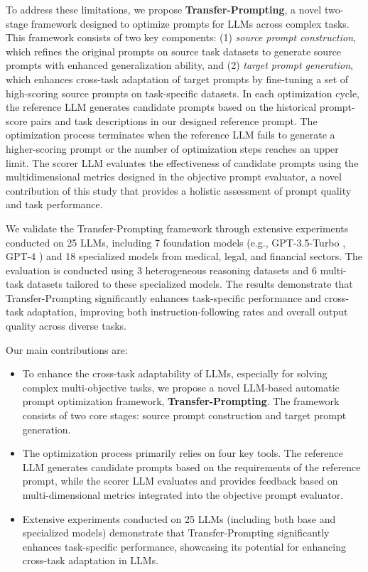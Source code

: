To address these limitations, we propose \textbf{Transfer-Prompting}, a novel two-stage framework designed to optimize prompts for LLMs across complex tasks. This framework consists of two key components: (1) \textit{source prompt construction}, which refines the original prompts on source task datasets to generate source prompts with enhanced generalization ability, and (2) \textit{target prompt generation}, which enhances cross-task adaptation of target prompts by fine-tuning a set of high-scoring source prompts on task-specific datasets.
In each optimization cycle, the reference LLM generates candidate prompts based on the historical prompt-score pairs and task descriptions in our designed reference prompt. The optimization process terminates when the reference LLM fails to generate a higher-scoring prompt or the number of optimization steps reaches an upper limit. The scorer LLM evaluates the effectiveness of candidate prompts using the multidimensional metrics designed in the objective prompt evaluator, a novel contribution of this study that provides a holistic assessment of prompt quality and task performance.

We validate the Transfer-Prompting framework through extensive experiments conducted on 25 LLMs, including 7 foundation models (e.g., GPT-3.5-Turbo \citep{chatgpt}, GPT-4 \citep{openai2023gpt4}) and 18 specialized models from medical, legal, and financial sectors. The evaluation is conducted using 3 heterogeneous reasoning datasets and 6 multi-task datasets tailored to these specialized models. The results demonstrate that Transfer-Prompting significantly enhances task-specific performance and cross-task adaptation, improving both instruction-following rates and overall output quality across diverse tasks.

Our main contributions are:
\begin{itemize}
    \item To enhance the cross-task adaptability of LLMs, especially for solving complex multi-objective tasks, we propose a novel LLM-based automatic prompt optimization framework, \textbf{Transfer-Prompting}. The framework consists of two core stages: source prompt construction and target prompt generation.
    \item The optimization process primarily relies on four key tools. The reference LLM generates candidate prompts based on the requirements of the reference prompt, while the scorer LLM evaluates and provides feedback based on multi-dimensional metrics integrated into the objective prompt evaluator.
    \item Extensive experiments conducted on 25 LLMs (including both base and specialized models) demonstrate that Transfer-Prompting significantly enhances task-specific performance, showcasing its potential for enhancing cross-task adaptation in LLMs.
\end{itemize}

